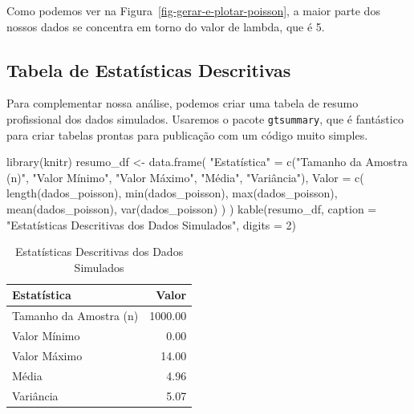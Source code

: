 \documentclass[
  portuguese,
  letterpaper,
  DIV=11,
  numbers=noendperiod]{scrartcl}
\newenvironment{Shaded}{\begin{snugshade}}{\end{snugshade}}
\newcommand{\AttributeTok}[1]{\textcolor[rgb]{0.40,0.45,0.13}{#1}}
\newcommand{\DecValTok}[1]{\textcolor[rgb]{0.68,0.00,0.00}{#1}}
\newcommand{\FunctionTok}[1]{\textcolor[rgb]{0.28,0.35,0.67}{#1}}
\newcommand{\NormalTok}[1]{\textcolor[rgb]{0.00,0.23,0.31}{#1}}
\newcommand{\OtherTok}[1]{\textcolor[rgb]{0.00,0.23,0.31}{#1}}
\newcommand{\StringTok}[1]{\textcolor[rgb]{0.13,0.47,0.30}{#1}}
\begin{document}
Como podemos ver na Figura~\ref{fig-gerar-e-plotar-poisson}, a maior
parte dos nossos dados se concentra em torno do valor de lambda, que é
5.

\subsection{Tabela de Estatísticas
Descritivas}\label{tabela-de-estatuxedsticas-descritivas}

Para complementar nossa análise, podemos criar uma tabela de resumo
profissional dos dados simulados. Usaremos o pacote \texttt{gtsummary},
que é fantástico para criar tabelas prontas para publicação com um
código muito simples.

\begin{Shaded}
\begin{Highlighting}[]
\FunctionTok{library}\NormalTok{(knitr)}
\NormalTok{resumo\_df }\OtherTok{\textless{}{-}} \FunctionTok{data.frame}\NormalTok{(}
  \StringTok{"Estatística"} \OtherTok{=} \FunctionTok{c}\NormalTok{(}\StringTok{"Tamanho da Amostra (n)"}\NormalTok{,}
                  \StringTok{"Valor Mínimo"}\NormalTok{,}
                  \StringTok{"Valor Máximo"}\NormalTok{,}
                  \StringTok{"Média"}\NormalTok{,}
                  \StringTok{"Variância"}\NormalTok{),}
  \AttributeTok{Valor =} \FunctionTok{c}\NormalTok{(}
    \FunctionTok{length}\NormalTok{(dados\_poisson),}
    \FunctionTok{min}\NormalTok{(dados\_poisson),}
    \FunctionTok{max}\NormalTok{(dados\_poisson),}
    \FunctionTok{mean}\NormalTok{(dados\_poisson),}
    \FunctionTok{var}\NormalTok{(dados\_poisson)}
\NormalTok{  )}
\NormalTok{)}
\FunctionTok{kable}\NormalTok{(resumo\_df,}
      \AttributeTok{caption =} \StringTok{"Estatísticas Descritivas dos Dados Simulados"}\NormalTok{,}
      \AttributeTok{digits =} \DecValTok{2}\NormalTok{)}
\end{Highlighting}
\end{Shaded}

\begin{longtable}[]{@{}lr@{}}

\caption{\label{tbl-resumo}Estatísticas Descritivas dos Dados Simulados}

\tabularnewline

\toprule\noalign{}
Estatística & Valor \\
\midrule\noalign{}
\endhead
\bottomrule\noalign{}
\endlastfoot
Tamanho da Amostra (n) & 1000.00 \\
Valor Mínimo & 0.00 \\
Valor Máximo & 14.00 \\
Média & 4.96 \\
Variância & 5.07 \\

\end{longtable}
\end{document}
